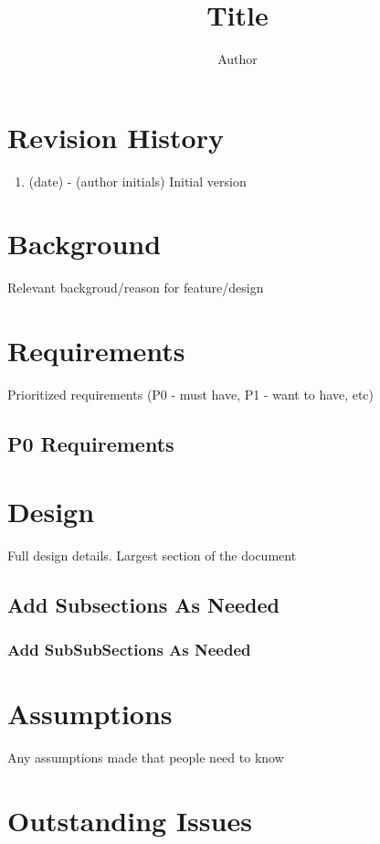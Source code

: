 \documentclass{article}
\begin{document}
\title{Title}
\author{Author}
\maketitle
\makeauthor
\thispagestyle{fancy}

\section{Revision History}
\begin{enumerate}
  \item (date) - (author initials) Initial version
\end{enumerate}
\section{Background}
Relevant backgroud/reason for feature/design

\section{Requirements}
Prioritized requirements (P0 - must have, P1 - want to have, etc)
\subsection{P0 Requirements}

\section{Design}

Full design details.  Largest section of the document

\subsection{Add Subsections As Needed}

\subsubsection{Add SubSubSections As Needed}


\section{Assumptions}

Any assumptions made that people need to know

\section{Outstanding Issues}
\end{document}

